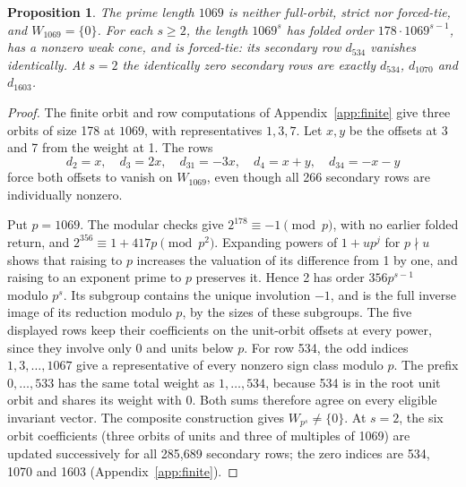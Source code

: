 \documentclass[11pt,reqno]{amsart}
\newtheorem{proposition}[theorem]{Proposition}
\theoremstyle{definition}
\begin{document}
\begin{proposition}\label{prop:1069}
The prime length \(1069\) is neither full-orbit, strict nor forced-tie, and \(W_{1069}=\{0\}\). For each \(s\ge2\), the length \(1069^s\) has folded order \(178\cdot1069^{s-1}\), has a nonzero weak cone, and is forced-tie: its secondary row \(d_{534}\) vanishes identically. At \(s=2\) the identically zero secondary rows are exactly \(d_{534}\), \(d_{1070}\) and \(d_{1603}\).
\end{proposition}
\begin{proof}
The finite orbit and row computations of Appendix~\ref{app:finite} give three orbits of size 178 at \(1069\), with representatives \(1,3,7\). Let \(x,y\) be the offsets at 3 and 7 from the weight at 1. The rows
\[
 d_2=x,\quad d_3=2x,\quad d_{31}=-3x,\quad
 d_4=x+y,\quad d_{34}=-x-y
\]
force both offsets to vanish on \(W_{1069}\), even though all 266 secondary rows are individually nonzero.

Put \(p=1069\). The modular checks give \(2^{178}\equiv-1\pmod p\), with no earlier folded return, and \(2^{356}\equiv1+417p\pmod{p^2}\). Expanding powers of \(1+up^j\) for \(p\nmid u\) shows that raising to \(p\) increases the valuation of its difference from 1 by one, and raising to an exponent prime to \(p\) preserves it. Hence 2 has order \(356p^{s-1}\) modulo \(p^s\). Its subgroup contains the unique involution \(-1\), and is the full inverse image of its reduction modulo \(p\), by the sizes of these subgroups. The five displayed rows keep their coefficients on the unit-orbit offsets at every power, since they involve only 0 and units below \(p\). For row 534, the odd indices \(1,3,\ldots,1067\) give a representative of every nonzero sign class modulo \(p\). The prefix \(0,\ldots,533\) has the same total weight as \(1,\ldots,534\), because 534 is in the root unit orbit and shares its weight with 0. Both sums therefore agree on every eligible invariant vector. The composite construction gives \(W_{p^s}\ne\{0\}\). At \(s=2\), the six orbit coefficients (three orbits of units and three of multiples of 1069) are updated successively for all 285,689 secondary rows; the zero indices are 534, 1070 and 1603 (Appendix~\ref{app:finite}).
\end{proof}
\end{document}
